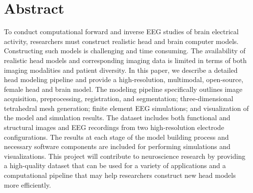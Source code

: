 %

\section*{Abstract}

To conduct computational forward and inverse EEG studies of brain electrical activity, researchers must construct realistic head and brain computer models. Constructing such models is challenging and time consuming. The availability of realistic head models and corresponding imaging data is limited in terms of both imaging modalities and patient diversity. In this paper, we describe a detailed head modeling pipeline and provide a high-resolution, multimodal, open-source, female head and brain model. The modeling pipeline specifically outlines image acquisition, preprocessing, registration, and segmentation; three-dimensional tetrahedral mesh generation; finite element EEG simulations; and visualization of the model and simulation results. The dataset includes both functional and structural images and EEG recordings from two high-resolution electrode configurations. The results at each stage of the model building process and necessary software components are included for performing simulations and visualizations. This project will contribute to neuroscience research by providing a high-quality dataset that can be used for a variety of applications and a computational pipeline that may help researchers construct new head models more efficiently.